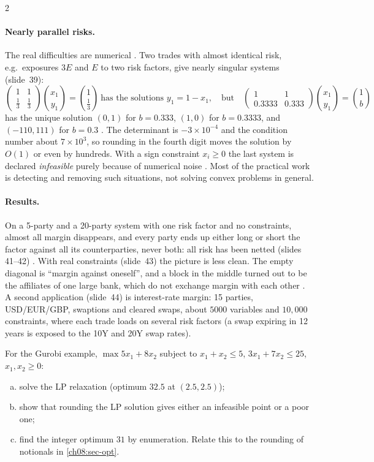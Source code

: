 \begin{paracol}{2}
\paragraph{Nearly parallel risks.} The real difficulties are numerical . Two trades with almost
identical risk, e.g.\ exposures $3E$ and $E$ to two risk factors, give nearly singular systems (slide~39):
\[
  \begin{pmatrix}1&1\\ \tfrac13&\tfrac13\end{pmatrix}\binom{x_1}{y_1}=\binom{1}{\tfrac13}\ \text{has the solutions } y_1=1-x_1,
  \quad\text{but}\quad
  \begin{pmatrix}1&1\\ 0.3333&0.333\end{pmatrix}\binom{x_1}{y_1}=\binom{1}{b}
\]
has the unique solution $(0,1)$ for $b=0.333$, $(1,0)$ for $b=0.3333$, and $(-110,111)$ for $b=0.3$
. The determinant is $-3\times10^{-4}$ and the condition number about $7\times10^3$, so rounding in
the fourth digit moves the solution by $O(1)$ or even by hundreds. With a sign constraint $x_i\ge0$ the last system
is declared \emph{infeasible} purely because of numerical noise . Most of the practical work is
detecting and removing such situations, not solving convex problems in general.

\paragraph{Results.} On a 5-party and a 20-party system with one risk factor and no constraints, almost all margin
disappears, and every party ends up either long or short the factor against all its counterparties, never both:
all risk has been netted (slides 41--42) . With real constraints (slide~43) the picture is less
clean. The empty diagonal is ``margin against oneself'', and a block in the middle turned out to be the affiliates
of one large bank, which do not exchange margin with each other . A second application
(slide~44) is interest-rate margin: 15 parties, USD/EUR/GBP, swaptions and cleared swaps, about $5000$ variables
and $10{,}000$ constraints, where each trade loads on several risk factors (a swap expiring in 12 years is exposed to
the 10Y and 20Y swap rates).

\begin{exercise}
For the Gurobi example, $\max 5x_1+8x_2$ subject to $x_1+x_2\le5$, $3x_1+7x_2\le25$, $x_1,x_2\ge0$:
\begin{enumerate}[(a)]
  \item solve the LP
      relaxation (optimum $32.5$ at $(2.5,2.5)$);
  \item show that rounding the LP solution gives either an infeasible point or a
      poor one;
  \item find the integer optimum $31$ by enumeration. Relate this to the rounding of notionals in
      \cref{ch08:sec-opt}.
\end{enumerate}
\end{exercise}


\end{paracol}
